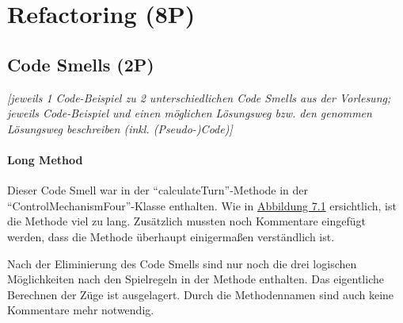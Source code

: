 

\newpage
\titlespacing*{\chapter}{0pt}{-30mm}{10pt}
  
\chapter{Refactoring (8P)}
\pagestyle{scrheadings}
\clearscrheadfoot
{}
\setcounter{page}{29}
\ofoot[\pagemark]{\pagemark}
\onehalfspacing

\section{Code Smells (2P)}
\emph{[jeweils 1 Code-Beispiel zu 2 unterschiedlichen Code Smells aus der Vorlesung; jeweils Code-Beispiel
und einen möglichen Lösungsweg bzw. den genommen Lösungsweg beschreiben (inkl. (Pseudo-)Code)]}

\subsubsection{Long Method}
\noindent Dieser Code Smell war in der \enquote{calculateTurn}-Methode in der \enquote{ControlMechanismFour}-Klasse enthalten. Wie in \hyperref[fig:longmethod]{Abbildung 7.1} ersichtlich, ist die Methode viel zu lang. Zusätzlich mussten noch Kommentare eingefügt werden, dass die Methode überhaupt einigermaßen verständlich ist. 

Nach der Eliminierung des Code Smells sind nur noch die drei logischen Möglichkeiten nach den Spielregeln in der Methode enthalten. Das eigentliche Berechnen der Züge ist ausgelagert. Durch die Methodennamen sind auch keine Kommentare mehr notwendig.

